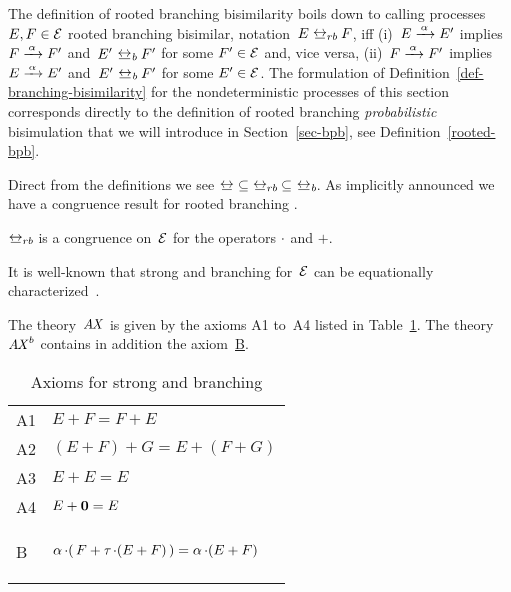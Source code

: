 \noindent
The definition of rooted branching bisimilarity boils down to calling
processes $E, F \in \mathcal{E}$ rooted branching bisimilar,
notation~$E \rootedbrbisim F$, iff (i)~$E \arrow{\alpha} E'$ implies
$F \arrow{\alpha} F'$ and~$E' \brbisim F'$ for some $F' \in \mathcal{E}$
and, vice versa, (ii)~$F \arrow{\alpha} F'$ implies
$E \arrow{\alpha} E'$ and~$E' \brbisim F'$ for some $E' \in
\mathcal{E}$. The formulation of Definition~\ref{def-branching-bisimilarity}
for the nondeterministic processes of this section corresponds
directly to the definition of rooted branching \emph{probabilistic}
bisimulation that we will introduce in Section~\ref{sec-bpb}, see
Definition~\ref{rooted-bpb}. 
 
\blankline

\noindent
Direct from the definitions we see ${\bisim} \subseteq
{\rootedbrbisim} \subseteq {\brbisim}$. As implicitly announced we
have a congruence result for rooted branching {\bisimilarity}.

\begin{lemma}
  $\rootedbrbisim$ is a congruence on~$\mathcal{E}$ for the operators $\mathop{.}$ and $+$.
\end{lemma}

\noindent
It is well-known that strong and branching {\bisimilarity} for~$\mathcal{E}$
can be equationally characterized~\cite{BBR10:cup,GW96:jacm,Mil89:phi}.

\begin{definition}
  The theory~$\mathit{A \mkern-2mu X}$ is given by the axioms A1 to~A4 listed in
  Table~\ref{table-axiomatization-of-branching-bisimilarity}.
  The theory~$\mathit{A \mkern-2mu X}^b$ contains in addition the axiom~\hyperlink{B}{B}.
\end{definition}

\begin{table}
  \vspace{-4ex}
  \centering
  \def\arraystretch{1.1}
  \begin{tabular}{|@{\;}l@{\ \;}l|}
    \hline
    A1 & $E + F = F + E$ \rule{0pt}{12pt} \\
    A2 & $(E + F) + G = E + ( F + G)$ \\
    A3 & $E + E = E$ \\
    A4 & $E + \normalfont{\textbf{0}} = E$ 
    \rule[-5pt]{0pt}{12pt}
    \\ \hline
    \hypertarget{B}{B} & $\alpha \mathop{.} ( \, F + \tau \mathop{.} ( E + F )
    \, ) = \alpha 
    \mathop{.} ( E + F )$
    \rule{0pt}{12pt}\rule[-5pt]{0pt}{12pt} \\ 
    \hline
  \end{tabular}
  \def\arraystretch{1.0}

  \medskip

  \caption{Axioms for strong and branching {\bisimilarity}}
  \label{table-axiomatization-of-branching-bisimilarity}
  \vspace{-4ex}
\end{table}

